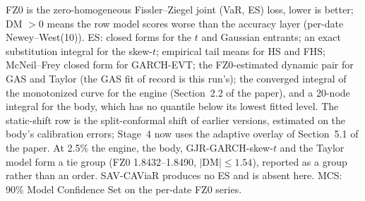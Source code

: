 \documentclass[11pt]{article}
\begin{document}
\begin{table}[htbp]
\begin{threeparttable}
\begin{tablenotes}
\item FZ0 is the zero-homogeneous Fissler--Ziegel joint (VaR, ES) loss, lower is better; DM $>0$ means the row model scores worse than the accuracy layer (per-date Newey--West(10)). ES: closed forms for the $t$ and Gaussian entrants; an exact substitution integral for the skew-$t$; empirical tail means for HS and FHS; McNeil--Frey closed form for GARCH-EVT; the FZ0-estimated dynamic pair for GAS and Taylor (the GAS fit of record is this run's); the converged integral of the monotonized curve for the engine (Section~2.2 of the paper), and a 20-node integral for the body, which has no quantile below its lowest fitted level. The static-shift row is the split-conformal shift of earlier versions, estimated on the body's calibration errors; Stage~4 now uses the adaptive overlay of Section~5.1 of the paper. At 2.5\% the engine, the body, GJR-GARCH-skew-$t$ and the Taylor model form a tie group (FZ0 1.8432--1.8490, $|$DM$|\le1.54$), reported as a group rather than an order. SAV-CAViaR produces no ES and is absent here. MCS: 90\% Model Confidence Set on the per-date FZ0 series.
\end{tablenotes}
\end{threeparttable}
\end{table}
\end{document}
